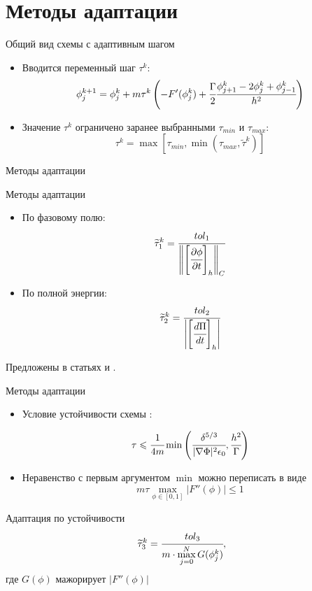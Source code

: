 
\section{Методы адаптации}

\begin{frame}{Общий вид схемы с адаптивным шагом}
\begin{itemize}
	\item Вводится переменный шаг $\tau^k$:
	\[
		\phi_j^{k + 1} = \phi_j^k + m \tau^k \left( -F'(\phi_j^k) + \cfrac{\Gamma}{2} \cfrac{{\phi}_{j + 1}^k - 2 {\phi}_j^k + {\phi}_{j - 1}^k}{h^2} \right)
	\]
	\item Значение $\tau^k$ ограничено заранее выбранными $\tau_{min}$ и $\tau_{max}$:
	\[
		\tau^k = \max \left[ \tau_{min}, \min( \tau_{max}, \widetilde{\tau}^k) \right]
	\]
\end{itemize}
\end{frame}


\begin{frame}{Методы адаптации}
\vspace{-0.7cm}
\begin{block}{Методы адаптации}
	\begin{itemize}
		\item По фазовому полю:
		\[
			\widetilde{\tau}_1^k = \cfrac{tol_1}{\left\| \left[ \cfrac{\partial \phi}{\partial t} \right]_h \right\|_C}
		\]
		\item По полной энергии:
		\[
			\widetilde{\tau}_2^k = \cfrac{tol_2}{\left| \left[ \cfrac{d \Pi}{dt} \right]_h \right|}
		\]
	\end{itemize}
\end{block}
Предложены в статьях \cite{li_time_step} и \cite{zhang_time_step}.
\end{frame}

{\nologo
\begin{frame}{Методы адаптации}
\vspace{-0.6cm}
\begin{itemize}
	\item Условие устойчивости схемы \cite{ponomarev_stability}:
	\vspace{-0.3cm}

	\[
		\tau \leqslant \cfrac{1}{4m} \min \left( \cfrac{\delta^{5/3}}{|\nabla \Phi|^2 \epsilon_0}, \cfrac{h^2}{\Gamma} \right)
	\]
	\vspace{-0.3cm}
	\item Неравенство с первым аргументом $\min$ можно переписать в виде
	\[
		m \tau \max\limits_{\phi \in [0, 1]} |F''(\phi)| \leqslant 1
	\]
\end{itemize}
\vspace{-0.3cm}
\begin{block}{Адаптация по устойчивости}
	\[
		\widetilde{\tau}_3^k = \cfrac{tol_3}{m \cdot \max\limits_{j = 0}^N G(\phi_j^k)},
	\]
	где $G(\phi)$ мажорирует $|F''(\phi)|$
\end{block}
\end{frame}
}